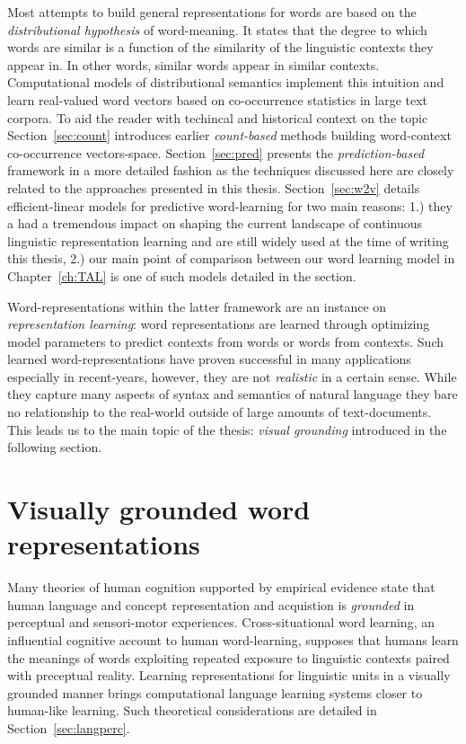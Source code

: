 Most attempts to build  general representations for words are based on the 
\emph{distributional hypothesis} of word-meaning. It states that the degree to which words are similar 
is a function of the similarity of the linguistic contexts they appear in. In other words, similar 
words appear in similar contexts. Computational models of distributional
semantics implement this intuition and learn real-valued word vectors based on co-occurrence
statistics in large text corpora.
To aid the reader with techincal and historical context 
on the topic Section~\ref{sec:count} introduces earlier \emph{count-based} 
methods building word-context co-occurrence vectors-space. 
Section~\ref{sec:pred} presents the  \emph{prediction-based} framework in a more 
detailed fashion as the techniques discussed here are closely related
to the approaches presented in this thesis. 
Section~\ref{sec:w2v} details efficient-linear 
models for predictive word-learning for two main reasons: 1.) they a had a tremendous impact
on shaping the current landscape of continuous linguistic representation learning and are still
widely used at the time of writing this thesis, 2.) our main point of comparison between
our word learning model in Chapter~\ref{ch:TAL} is one of such models detailed in the section.

Word-representations within the latter framework are an instance on \emph{representation learning}:
word representations are learned through
optimizing model parameters to predict contexts from words or words from contexts.
Such learned word-representations have proven successful in many applications especially 
in recent-years, however, they are not \emph{realistic} in a certain sense. While they capture many
aspects of syntax and semantics of natural language they bare no relationship to the real-world
outside of large amounts of text-documents.
This leads us to the main topic of the thesis:  \emph{visual grounding} introduced in the
following section.

\section{Visually grounded word representations}


Many theories of human cognition supported by empirical
evidence state that human language and concept representation and acquistion is \emph{grounded}
in perceptual and sensori-motor experiences. Cross-situational word learning, 
an influential cognitive account to human word-learning, supposes that humans learn the
meanings of words exploiting repeated exposure to linguistic contexts paired with preceptual reality.
Learning representations for linguistic units in a visually grounded manner brings
computational language learning systems closer to human-like learning. 
Such theoretical considerations are detailed in Section~\ref{sec:langperc}.


